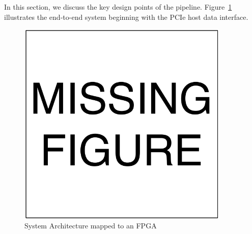 In this section, we discuss the key design points of the pipeline.
Figure~\ref{fig:sys_arch} illustrates the end-to-end system beginning with the PCIe host data interface.

\begin{figure}[htb!]
\vspace{0pt}
\centering
\includegraphics[width=0.9\textwidth]{./figures/MissingFigure.pdf}
\vspace{0pt}
\caption{System Architecture mapped to an FPGA}\label{fig:sys_arch}
\vspace{0pt}
\end{figure}

